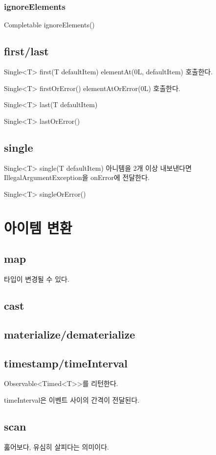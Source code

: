 \documentclass{book}
\begin{document}
{\subsubsection{ignoreElements}
Completable ignoreElements()

\subsection{first/last}
Single<T> first(T defaultItem) 
elementAt(0L, defaultItem) 호출한다.

Single<T> firstOrError()
elementAtOrError(0L) 호출한다.

Single<T> last(T defaultItem)

Single<T> lastOrError()

\subsection{single}
Single<T> single(T defaultItem)
아니템을 2개 이상 내보낸다면 IllegalArgumentException을 onError에 전달한다.

Single<T> singleOrError()

\section{아이템 변환}
\subsection{map}
타입이 변경될 수 있다.



\subsection{cast}

\subsection{materialize/dematerialize}

\subsection{timestamp/timeInterval}
Observable<Timed<T>>를 리턴한다.

timeInterval은 이벤트 사이의 간격이 전달된다.

\subsection{scan}
훓어보다, 유심히 살피다는 의미이다.

}
\end{document}
